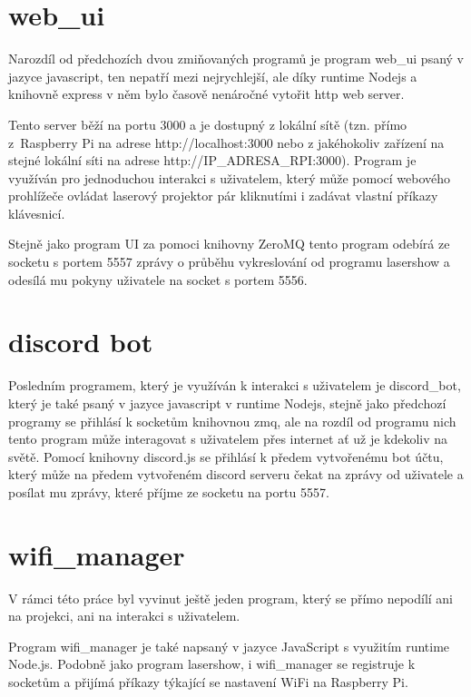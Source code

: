 \documentclass{template/socthesis}
\begin{document}
\section{web\_ui}

Narozdíl od předchozích dvou zmiňovaných programů je program web\_ui psaný v jazyce javascript, ten nepatří mezi nejrychlejší, ale díky runtime Nodejs a knihovně express v něm bylo časově nenáročné vytořit http web server.

Tento server běží na portu 3000 a je dostupný z lokální sítě (tzn. přímo z\ Raspberry Pi na adrese http://localhost:3000 nebo z jakéhokoliv zařízení na stejné lokální síti na adrese http://IP\_ADRESA\_RPI:3000).
Program je využíván pro jednoduchou interakci s uživatelem, který může pomocí webového prohlížeče ovládat laserový projektor pár kliknutími i zadávat vlastní příkazy klávesnicí.


Stejně jako program UI za pomoci knihovny ZeroMQ tento program odebírá ze socketu s portem 5557 zprávy o průběhu vykreslování od programu lasershow a odesílá mu pokyny uživatele na socket s portem 5556.



\section{discord bot}

Posledním programem, který je využíván k interakci s uživatelem je discord\_bot, který je také psaný v jazyce javascript v runtime Nodejs, stejně jako předchozí programy se přihlásí k socketům knihovnou zmq, ale na rozdíl od programu nich tento program může interagovat s uživatelem přes internet ať už je kdekoliv na světě.
Pomocí knihovny discord.js se přihlásí k předem vytvořenému bot účtu, který může na předem vytvořeném discord serveru čekat na zprávy od uživatele a posílat mu zprávy, které příjme ze socketu na portu 5557.

\section{wifi\_manager}

V rámci této práce byl vyvinut ještě jeden program, který se přímo nepodílí ani na projekci, ani na interakci s uživatelem.

Program wifi\_manager je také napsaný v jazyce JavaScript s využitím runtime Node.js. Podobně jako program lasershow, i wifi\_manager se registruje k socketům a přijímá příkazy týkající se nastavení WiFi na Raspberry Pi.
\end{document}
